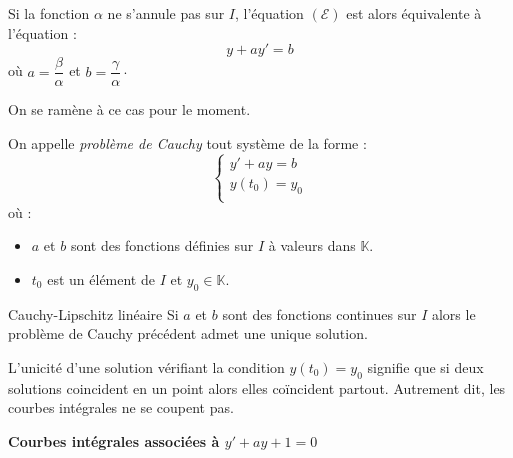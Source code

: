 \documentclass[a4paper,10pt]{report}
\begin{document}
Si la fonction $\alpha$ ne s'annule pas sur $I$, l'équation $(\mathcal{E})$ est alors équivalente à l'équation :
$$ y+ay'=b$$
où $a = \dfrac{\beta}{\alpha}$ et $b = \dfrac{\gamma}{\alpha} \cdot$

\medskip

On se ramène à ce cas pour le moment.

\begin{Definition}{} On appelle \emph{problème de Cauchy} tout système de la forme :
$$ \left\lbrace \begin{array}{ccl}
y'+ay=b \\
y(t_0)=y_0 \\
\end{array}\right.$$
où :
\begin{itemize}
\item $a$ et $b$ sont des fonctions définies sur $I$ à valeurs dans $\mathbb{K}$.
\item $t_0$ est un élément de $I$ et $y_0 \in \mathbb{K}$.
\end{itemize}
\end{Definition}

\begin{Theoreme}{Cauchy-Lipschitz linéaire} Si $a$ et $b$ sont des fonctions continues sur $I$ alors le problème de Cauchy précédent admet une unique solution.
\end{Theoreme}

\begin{Remarque}{} L'unicité d'une solution vérifiant la condition $y(t_0)=y_0$ signifie que si deux solutions coincident en un point alors elles coïncident partout. Autrement dit, les courbes intégrales ne se coupent pas.
\end{Remarque}

\pagebreak

\begin{center}
\textbf{Courbes intégrales associées à $y'+ay+1=0$ }
\end{center}
\end{document}
